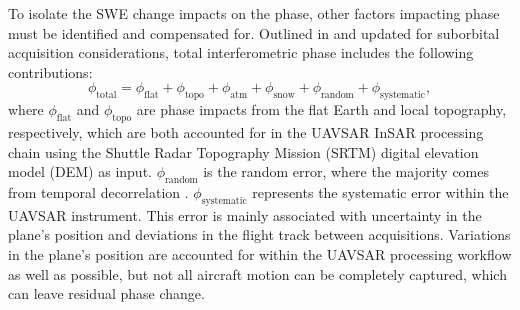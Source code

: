 To isolate the SWE change impacts on the phase, other factors impacting phase must be identified and compensated for. Outlined in \citet{deebMonitoringSnowpackEvolution2011} and updated for suborbital acquisition considerations, total interferometric phase includes the following contributions:
\begin{equation}
\phi_\mathrm{total} =  \phi_\mathrm{flat} + \phi_\mathrm{topo} + \phi_\mathrm{atm} + \phi_{\mathrm{snow}} + \phi_\mathrm{random} +\phi_\mathrm{systematic},
\end{equation}
where $\phi_\mathrm{flat}$ and $\phi_\mathrm{topo}$ are phase impacts from the flat Earth and local topography, respectively, which are both accounted for in the UAVSAR InSAR processing chain using the Shuttle Radar Topography Mission (SRTM) digital elevation model (DEM) as input. $\phi_\mathrm{random}$ is the random error, where the majority comes from temporal decorrelation \citep{zebkerAtmosphericEffectsInterferometric1997}. $\phi_\mathrm{systematic}$ represents the systematic error within the UAVSAR instrument. This error is mainly associated with uncertainty in the plane's position and deviations in the flight track between acquisitions. Variations in the plane's position are accounted for within the UAVSAR processing workflow as well as possible, but not all aircraft motion can be completely captured, which can leave residual phase change.

